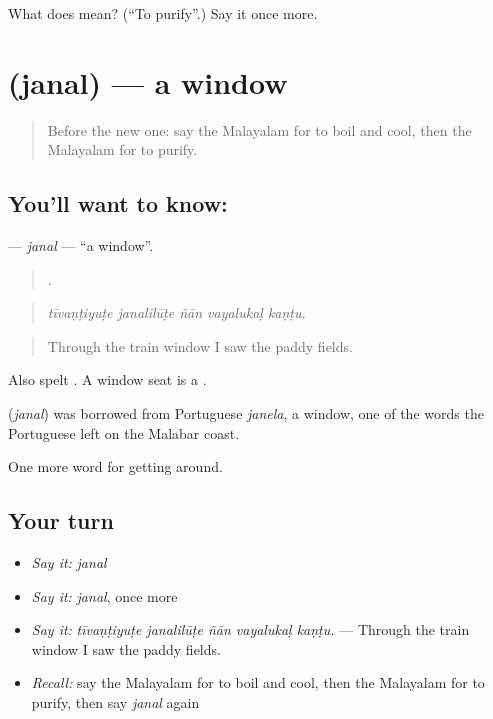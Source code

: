\begin{tcolorbox}[breakable,colback=teal!4,colframe=teal!35!black,title={Before you move on}]
What does  mean? (\textquotedblleft{}To purify\textquotedblright{}.) Say it once more.
\end{tcolorbox}
\section[\texorpdfstring{\ml{ജനൽ} (janal)}{ജനൽ (janal)}]{ (janal) — a window}

\label{lesson:ML-C484-janal}



\begin{quote}
Before the new one: say the Malayalam for to boil and cool, then the Malayalam for to purify.
\end{quote}

\subsection*{You'll want to know: }
\textbf{} — \emph{janal} — \textquotedblleft{}a window\textquotedblright{}.

\begin{quote}
    .
\end{quote}

\begin{quote}
\emph{tīvaṇṭiyuṭe janalilūṭe ñān vayalukaḷ kaṇṭu.}
\end{quote}

\begin{quote}
Through the train window I saw the paddy fields.
\end{quote}

Also spelt . A window seat is a  .

\begin{cousinweb}
\textbf{} (\emph{janal}) was borrowed from Portuguese \emph{janela}, a window, one of the words the Portuguese left on the Malabar coast.
\end{cousinweb}

\begin{grammarlens}[title={What you've built}]
One more word for getting around.
\end{grammarlens}

\subsection*{Your turn}
\begin{itemize}
\raggedright
  \item \emph{Say it:} \emph{janal}
  \item \emph{Say it:} \emph{janal}, once more
  \item \emph{Say it:} \emph{tīvaṇṭiyuṭe janalilūṭe ñān vayalukaḷ kaṇṭu.} — Through the train window I saw the paddy fields.
  \item \emph{Recall:} say the Malayalam for to boil and cool, then the Malayalam for to purify, then say \emph{janal} again
\end{itemize}

